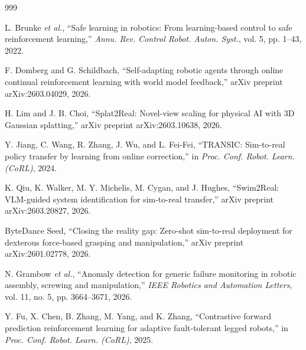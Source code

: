 \documentclass[11pt,a4paper]{article}
\begin{document}
\begin{thebibliography}{999}

L. Brunke \textit{et al.}, ``Safe learning in robotics: From learning-based control to safe reinforcement learning,'' \textit{Annu. Rev. Control Robot. Auton. Syst.}, vol. 5, pp. 1--43, 2022.




F. Domberg and G. Schildbach, ``Self-adapting robotic agents through online continual reinforcement learning with world model feedback,'' arXiv preprint arXiv:2603.04029, 2026.




H. Lim and J. B. Choi, ``Splat2Real: Novel-view scaling for physical {AI} with {3D} Gaussian splatting,'' arXiv preprint arXiv:2603.10638, 2026.




Y. Jiang, C. Wang, R. Zhang, J. Wu, and L. Fei-Fei, ``{TRANSIC}: Sim-to-real policy transfer by learning from online correction,'' in \textit{Proc. Conf. Robot. Learn. (CoRL)}, 2024.




K. Qiu, K. Walker, M. Y. Michelis, M. Cygan, and J. Hughes, ``Swim2Real: VLM-guided system identification for sim-to-real transfer,'' arXiv preprint arXiv:2603.20827, 2026.




ByteDance Seed, ``Closing the reality gap: Zero-shot sim-to-real deployment for dexterous force-based grasping and manipulation,'' arXiv preprint arXiv:2601.02778, 2026.





N. Grambow \textit{et al.}, ``Anomaly detection for generic failure monitoring in robotic assembly, screwing and manipulation,'' \textit{IEEE Robotics and Automation Letters}, vol. 11, no. 5, pp. 3664--3671, 2026.




Y. Fu, X. Chen, B. Zhang, M. Yang, and K. Zhang, ``Contrastive forward prediction reinforcement learning for adaptive fault-tolerant legged robots,'' in \textit{Proc. Conf. Robot. Learn. (CoRL)}, 2025.




\end{thebibliography}
\end{document}

